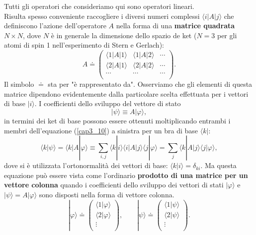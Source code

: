 \documentclass[a4paper,12pt,oneside]{book}
\begin{document}
Tutti gli operatori che consideriamo qui sono operatori lineari.\\
Risulta spesso conveniente raccogliere i diversi numeri complessi $\langle i | A | j \rangle$ che definiscono l'azione dell'operatore $A$ nella forma di una \textbf{matrice quadrata} $N\times N$, dove $N$ è in generale la dimensione dello spazio de ket ($N=3$ per gli atomi di spin 1 nell'esperimento di Stern e Gerlach):
	\begin{equation}
		\boxed{
			A \doteq
			\begin{pmatrix}
			\langle 1 | A  | 1 \rangle & \langle 1 | A  | 2 \rangle & \cdots\\
			\langle 2 | A  | 1 \rangle & \langle 2 | A  | 2 \rangle & \cdots \\
\cdots & \cdots & \cdots \\
			\end{pmatrix} .
			}
	\end{equation}
Il simbolo $\doteq$ sta per "è rappresentato da".
Osserviamo che gli elementi di questa matrice dipendono evidentemente dalla particolare scelta effettuata per i vettori di base $| i \rangle$.
I coefficienti dello sviluppo del vettore di stato
	\begin{equation}
		| \psi \rangle \equiv A | \varphi \rangle ,
	\end{equation}
in termini dei ket di base possono essere ottenuti moltiplicando entrambi i membri dell'equazione (\ref{cap3_10}) a sinistra per un bra di base $\langle k | $:
	\begin{equation}
		\langle k | \psi \rangle = \langle k | A | \varphi \rangle \equiv \sum \limits_{i,j} \langle k | i \rangle \langle i | A | j\rangle \langle j | \varphi \rangle = \sum \limits_{j} \langle k | A | j \rangle \langle j | \varphi \rangle ,
	\end{equation}
dove si è utilizzata l'ortonormalità dei vettori di base: $\langle k | i \rangle =\delta_{ki}$. Ma questa equazione può essere vista come l'ordinario \textbf{prodotto di una matrice per un vettore colonna} quando i coefficienti dello sviluppo dei vettori di stati $| \varphi \rangle$ e $| \psi \rangle =A | \varphi \rangle$ sono disposti nella forma di vettore colonna.
	\begin{equation}
		\boxed{
			| \varphi \rangle \doteq 
			\begin{pmatrix}
			\langle 1 | \varphi \rangle \\
			\langle 2 | \varphi \rangle \\
			\vdots \\
			\end{pmatrix}, \qquad
			| \psi \rangle \doteq 
			\begin{pmatrix}
			\langle 1 | \psi \rangle \\
			\langle 2 | \psi \rangle \\
			\vdots \\
			\end{pmatrix} .
			}
	\end{equation}
\end{document}
